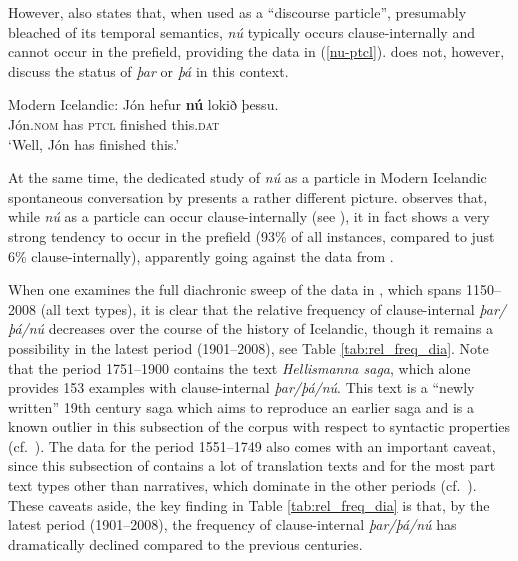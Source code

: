 \documentclass[output=paper,colorlinks,citecolor=brown]{langscibook}
\begin{document}
However, \citet[40]{Thrainsson2007} also states that, when used as a ``discourse particle'', presumably bleached of its temporal semantics, \textit{nú} typically occurs clause-internally and cannot occur in the prefield, providing the data in (\ref{nu-ptcl}). \citet{Thrainsson2007} does not, however, discuss the status of \textit{þar} or \textit{þá} in this context.

\ea \label{nu-ptcl} Modern Icelandic:
\ea
\gll Jón hefur \textbf{nú} lokið þessu.\\
Jón.\textsc{nom} has \textsc{ptcl} finished this.\textsc{dat}\\
\glt `Well, Jón has finished this.'
\z
\z

\noindent At the same time, the dedicated study of \textit{nú} as a particle in Modern Icelandic spontaneous conversation by \citet{hilmisdottir2010present} presents a rather different picture. \citet[276--277]{hilmisdottir2010present} observes that, while \textit{nú} as a particle can occur clause-internally (see ), it in fact shows a very strong tendency to occur in the prefield (93\% of all instances, compared to just 6\% clause-internally), apparently going against the data from \citet[40]{Thrainsson2007}.

When one examines the full diachronic sweep of the data in , which spans 1150--2008 (all text types), it is clear that the relative frequency of clause-internal \textit{þar/þá/nú} decreases over the course of the history of Icelandic, though it remains a possibility in the latest period (1901--2008), see Table \ref{tab:rel_freq_dia}. Note that the period 1751--1900 contains the text \textit{Hellismanna saga}, which alone provides 153 examples with clause-internal \textit{þar/þá/nú}. This text is a ``newly written'' 19th century saga which aims to reproduce an earlier saga  and is a known outlier in this subsection of the corpus with respect to syntactic properties (cf.~\citealp{schaetzle-booth2019}). The data for the period 1551--1749 also comes with an important caveat, since this subsection of  contains a lot of translation texts and for the most part text types other than narratives, which dominate in the other periods (cf.~\citealp[chapter 1]{booth2018}).
These caveats aside, the key finding in Table \ref{tab:rel_freq_dia} is that, by the latest period (1901--2008), the frequency of clause-internal \textit{þar/þá/nú} has dramatically declined compared to the previous centuries.
\end{document}

